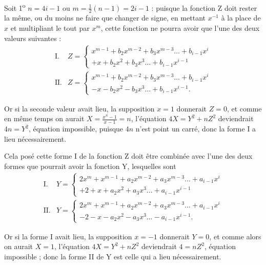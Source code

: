 \documentclass[11pt,a4paper]{article}
\begin{document}
Soit 1\textsuperscript{o} $n = 4i - 1$ ou $m = \frac{1}{2}(n-1) = 2i - 1$ :
puisque la fonction Z doit rester la même, ou du moins ne faire que
changer de signe, en mettant $x^{-1}$ à la place de $x$ et multipliant le
tout par $x^m$, cette fonction ne pourra avoir que l'une des deux valeurs
suivantes :
\[
\begin{array}{ll}
\text{I.} & Z = \left\{ \begin{array}{l}
x^{m-1} + b_2 x^{m-2} + b_3 x^{m-3} \ldots + b_{i-1} x^i \\
+ x + b_2 x^2 + b_3 x^3 \ldots + b_{i-1} x^{i-1}
\end{array} \right. \\[1ex]
\text{II.} & Z = \left\{ \begin{array}{l}
x^{m-1} + b_2 x^{m-2} + b_3 x^{m-3} \ldots + b_{i-1} x^i \\
- x - b_2 x^2 - b_3 x^3 \ldots + b_{i-1} x^{i-1}.
\end{array} \right.
\end{array}
\]

Or si la seconde valeur avait lieu, la supposition $x = 1$ donnerait
$Z = 0$, et comme en même temps on aurait $X = \frac{x^n - 1}{x - 1} = n$,
l'équation $4X = Y^2 + nZ^2$ deviendrait $4n = Y^2$, équation impossible,
puisque $4n$ n'est point un carré, donc la forme I a lieu nécessairement.

Cela posé cette forme I de la fonction Z doit être combinée avec l'une des
deux formes que pourrait avoir la fonction Y, lesquelles sont
\[
\begin{array}{ll}
\text{I.} & Y = \left\{ \begin{array}{l}
2x^m + x^{m-1} + a_2 x^{m-2} + a_3 x^{m-3} \ldots + a_{i-1} x^i \\
+ 2 + x + a_2 x^2 + a_3 x^3 \ldots + a_{i-1} x^{i-1}
\end{array} \right. \\[1ex]
\text{II.} & Y = \left\{ \begin{array}{l}
2x^m + x^{m-1} + a_2 x^{m-2} + a_3 x^{m-3} \ldots + a_{i-1} x^i \\
- 2 - x - a_2 x^2 - a_3 x^3 \ldots - a_{i-1} x^{i-1}.
\end{array} \right.
\end{array}
\]

Or si la forme I avait lieu, la supposition $x = -1$ donnerait $Y = 0$, et
comme alors on aurait $X = 1$, l'équation $4X = Y^2 + nZ^2$ deviendrait
$4 = nZ^2$, équation impossible ; donc la forme II de Y est celle qui a
lieu nécessairement.
\end{document}

